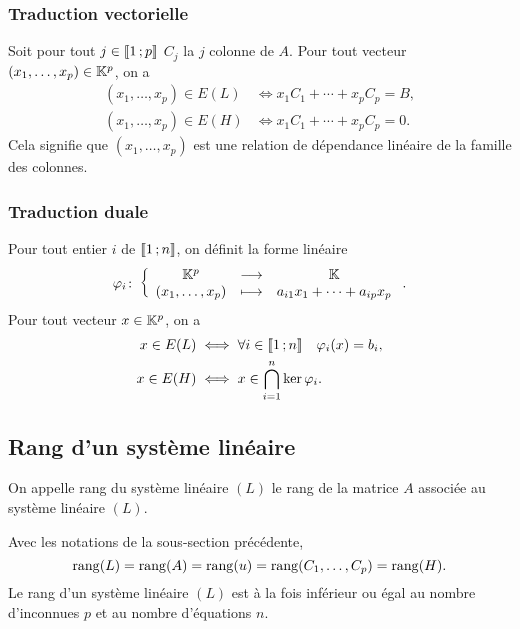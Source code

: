 \subsubsection{Traduction vectorielle}

Soit pour tout \(j \in \mathopen{\llbracket}1\mathclose{}\mathpunct{};p\mathclose{\rrbracket}\) \(C_j\) la \(j\)\ieme{} colonne de \(A\). Pour tout vecteur \((x_1,\ldots,x_p) \in \mathbb{K}^p\), on a
\begin{align}
  (x_1,\ldots,x_p) \in E(L) &\iff x_1C_1+\dotsb+x_pC_p = B, \\
  (x_1,\ldots,x_p) \in E(H) &\iff x_1C_1+\dotsb+x_pC_p = 0.
\end{align}
Cela signifie que \((x_1,\ldots,x_p)\) est une relation de dépendance linéaire de la famille des colonnes.

\subsubsection{Traduction duale}

Pour tout entier \(i\) de \(\mathopen{\llbracket}1\mathclose{}\mathpunct{};n\mathclose{\rrbracket}\), on définit la forme linéaire 
\begin{equation}
\varphi_i\colon \left\{\begin{array}{ccc} \mathbb{K}^p & \longrightarrow &\mathbb{K}\\ (x_1,\ldots,x_p) & \longmapsto & a_{i1}x_1+ \dotsb +a_{ip}x_p \end{array} \right..
\end{equation} 
 Pour tout vecteur \(x \in \mathbb{K}^p\), on a
\begin{align}
  x \in E(L) &\iff \forall i \in \mathopen{\llbracket}1\mathclose{}\mathpunct{};n\mathclose{\rrbracket} \quad \varphi_i(x) = b_i, \\
  x \in E(H) &\iff x\in\bigcap_{i = 1}^n\ker \varphi_i.
\end{align}

\subsection{Rang d'un système linéaire}

\begin{defdef}
  On appelle rang du système linéaire \((L)\) le rang de la matrice \(A\) associée au système linéaire \((L)\).
\end{defdef}
%
\begin{prop}
  Avec les notations de la sous-section précédente,
  \begin{equation}
    \operatorname{rang}(L)=\operatorname{rang}(A)=\operatorname{rang}(u)=\operatorname{rang}(C_1,\ldots,C_p) = \operatorname{rang}(H).
  \end{equation}
  Le rang d'un système linéaire \((L)\) est à la fois inférieur ou égal au nombre d'inconnues \(p\) et au nombre d'équations \(n\).
\end{prop}

